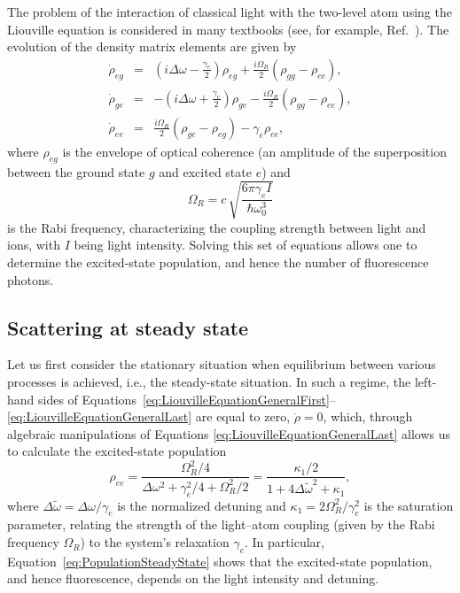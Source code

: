 The problem of the interaction of classical light with the two-level atom using the Liouville equation is considered in many textbooks (see, for example, Ref.~\cite{AuzinshBook2010}).  The evolution of the density matrix elements are given by
\begin{eqnarray}
        \dot{\rho}_{eg}&=&\left(i\Delta\omega-\frac{\gamma_e}{2}\right)\rho_{eg}+\frac{i\Omega_R}{2}(\rho_{gg}-\rho_{ee}),\label{eq:LiouvilleEquationGeneralFirst}\\ 
        \dot{\rho}_{ge}&=&-\left(i\Delta\omega+\frac{\gamma_e}{2}\right)\rho_{ge}-\frac{i\Omega_R}{2}(\rho_{gg}-\rho_{ee}),\\ 
        \dot{\rho}_{ee}&=&\frac{i\Omega_R}{2}(\rho_{ge}-\rho_{eg})-\gamma_e\rho_{ee}, 
        \label{eq:LiouvilleEquationGeneralLast}
\end{eqnarray}
where $\rho_{eg}$ is the envelope of optical coherence (an amplitude of the superposition between the ground state $g$ and excited state $e$) and 
\begin{equation}
\Omega_R=c\,\sqrt{\frac{6\pi\gamma_e I}{\hbar\omega_0^3}}
\label{eq:RabiFreq}
\end{equation}
is the Rabi frequency, characterizing the coupling strength between light and ions, with $I$ being light intensity.  Solving this set of equations allows one to determine the excited-state population, and hence the number of fluorescence photons.

\subsection{Scattering at steady state}
\label{subsec:SteadyState}

Let us first consider the stationary situation when equilibrium between various processes is achieved, i.e., the steady-state situation.  In such a regime, the left-hand sides of Equations~\ref{eq:LiouvilleEquationGeneralFirst}--\ref{eq:LiouvilleEquationGeneralLast} are equal to zero, $\dot{\rho}=0$, which, through algebraic manipulations of Equations \ref{eq:LiouvilleEquationGeneralLast} allows us to calculate the excited-state population
\begin{equation}
\rho_{ee}=\frac{\Omega_R^2/4}{\Delta\omega^2+\gamma_e^2/4+\Omega_R^2/2}=\frac{\kappa_1/2}{1+4\Delta\tilde{\omega}^2+\kappa_1},
    \label{eq:PopulationSteadyState}
\end{equation}
where $\Delta\tilde{\omega}=\Delta\omega/\gamma_e$ is the normalized detuning and $\kappa_1=2\Omega_R^2/\gamma_e^2$ is the saturation parameter, relating the strength of the light--atom coupling (given by the Rabi frequency $\Omega_R$) to the system's relaxation $\gamma_e$.   In particular, Equation~\ref{eq:PopulationSteadyState} shows that the excited-state population, and hence fluorescence, depends on the light intensity and detuning.  

